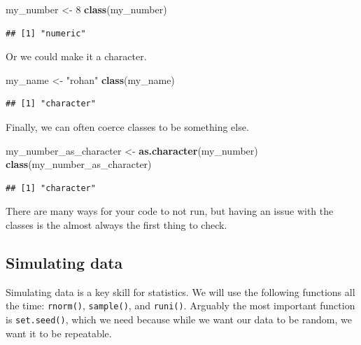 \documentclass[
]{book}
\newenvironment{Shaded}{\begin{snugshade}}{\end{snugshade}}
\newcommand{\DecValTok}[1]{\textcolor[rgb]{0.00,0.00,0.81}{#1}}
\newcommand{\KeywordTok}[1]{\textcolor[rgb]{0.13,0.29,0.53}{\textbf{#1}}}
\newcommand{\NormalTok}[1]{#1}
\newcommand{\StringTok}[1]{\textcolor[rgb]{0.31,0.60,0.02}{#1}}
\begin{document}
\begin{Shaded}
\begin{Highlighting}[]
\NormalTok{my_number <-}\StringTok{ }\DecValTok{8}
\KeywordTok{class}\NormalTok{(my_number)}
\end{Highlighting}
\end{Shaded}

\begin{verbatim}
## [1] "numeric"
\end{verbatim}

Or we could make it a character.

\begin{Shaded}
\begin{Highlighting}[]
\NormalTok{my_name <-}\StringTok{ "rohan"}
\KeywordTok{class}\NormalTok{(my_name)}
\end{Highlighting}
\end{Shaded}

\begin{verbatim}
## [1] "character"
\end{verbatim}

Finally, we can often coerce classes to be something else.

\begin{Shaded}
\begin{Highlighting}[]
\NormalTok{my_number_as_character <-}\StringTok{ }\KeywordTok{as.character}\NormalTok{(my_number)}
\KeywordTok{class}\NormalTok{(my_number_as_character)}
\end{Highlighting}
\end{Shaded}

\begin{verbatim}
## [1] "character"
\end{verbatim}

There are many ways for your code to not run, but having an issue with the classes is the almost always the first thing to check.

\hypertarget{simulating-data}{%
\subsection{Simulating data}\label{simulating-data}}

Simulating data is a key skill for statistics. We will use the following functions all the time: \texttt{rnorm()}, \texttt{sample()}, and \texttt{runi()}. Arguably the most important function is \texttt{set.seed()}, which we need because while we want our data to be random, we want it to be repeatable.
\end{document}

